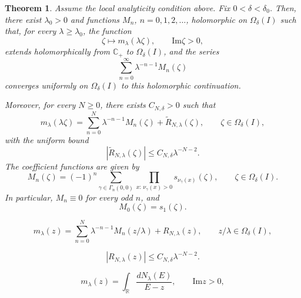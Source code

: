 \documentclass[10pt,a4paper]{amsart}
\newtheorem{thm}{Theorem}
\newcommand{\Impart}{\mathrm{Im}}
\begin{document}
\begin{thm}\label{thm:main-resolvent}
Assume the local analyticity condition above. 
Fix $0<\delta<\delta_0$.
Then, there exist $\lambda_0>0$ and functions $M_n$, $n=0,1,2,\ldots$,
holomorphic on $\Omega_\delta(I)$ such that, 
for every $\lambda\ge\lambda_0$, the function
$$
\zeta\mapsto m_\lambda(\lambda\zeta),
\qquad \Impart\zeta>0,
$$
extends holomorphically from $\mathbb C_+$ to $\Omega_\delta(I)$, and
the series
$$
\sum_{n=0}^{\infty}\lambda^{-n-1}M_n(\zeta)
$$
converges uniformly on $\Omega_\delta(I)$ to this holomorphic continuation.

Moreover, for every $N\ge0$, there exists $C_{N,\delta}>0$ such that
\begin{equation}
\label{eq:main-resolvent-expansion-zeta}
m_\lambda(\lambda\zeta)=\sum_{n=0}^{N}\lambda^{-n-1}M_n(\zeta)
+\widetilde R_{N,\lambda}(\zeta),\qquad\zeta\in\Omega_\delta(I),
\end{equation}
with the uniform bound
$$
|\widetilde R_{N,\lambda}(\zeta)|
\le
C_{N,\delta}\lambda^{-N-2}.
$$
The coefficient functions are given by
\begin{equation}
\label{eq:Mn-formula-statement}
M_n(\zeta)
=
(-1)^n
\sum_{\gamma\in\Gamma_n(0,0)}
\prod_{x:\,\nu_\gamma(x)>0}
s_{\nu_\gamma(x)}(\zeta),
\qquad
\zeta\in\Omega_\delta(I).
\end{equation}
In particular, $M_n\equiv0$ for every odd $n$, and
$$
M_0(\zeta)=s_1(\zeta).
$$
\end{thm}

\begin{equation}
\label{eq:main-resolvent-expansion}
m_\lambda(z)=\sum_{n=0}^{N}\lambda^{-n-1}M_n(z/\lambda)+R_{N,\lambda}(z),
\qquad z/\lambda\in\Omega_\delta(I),
\end{equation}

\begin{equation}
\label{eq:main-resolvent-remainder}
|R_{N,\lambda}(z)|
\le
C_{N,\delta}\lambda^{-N-2}.
\end{equation}

\begin{equation}
\label{eq:dos-stieltjes}
m_\lambda(z)=\int_{\mathbb R}\frac{dN_\lambda(E)}{E-z},
\qquad\Impart z>0,
\end{equation}
\end{document}
